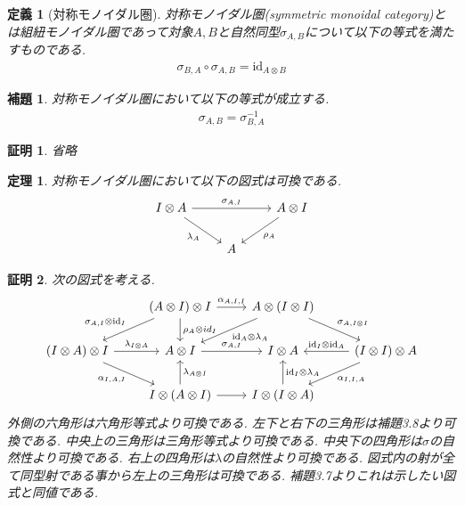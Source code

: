\documentclass[a4paper,12pt]{ltjsarticle}
\theoremstyle{break}
\newtheorem{defn}[thm]{定義}
\newtheorem{lem}[thm]{補題}
\newtheorem{thrm}[thm]{定理}
\newtheorem{eg}[thm]{例}
\newtheorem*{prf}{証明}
\newcommand{\rel}{\mathbf{Rel}}
\newcommand{\xr}[1]{\xrightarrow{#1}}
\newcommand{\id}{\mathrm{id}}
\newcommand{\ci}{\circ}
\newcommand{\al}{\alpha}
\newcommand{\la}{\lambda}
\newcommand{\si}{\sigma}
\newcommand{\ot}{\otimes}
\newcommand{\ti}{\times}
\numberwithin{equation}{section}
\begin{document}

\begin{defn}[対称モノイダル圏]
  対称モノイダル圏(symmetric monoidal category)とは組紐モノイダル圏であって対象$A,B$と自然同型$\si_{A,B}$について以下の等式を満たすものである. 
  \begin{align*}
    \si_{B,A} \ci \si_{A,B} = \id_{A \ot B}
  \end{align*}
\end{defn}

\begin{lem}
  対称モノイダル圏において以下の等式が成立する. 
  \begin{align*}
    \si_{A,B}=\si_{B,A}^{-1}
  \end{align*}
\end{lem} 

\begin{prf}
  省略
\end{prf}

\begin{thrm}
  対称モノイダル圏において以下の図式は可換である. 
  \[\begin{tikzcd}
    {I \ot A} && {A \ot I} \\
    & A
    \arrow["{\si_{A,I}}", from=1-1, to=1-3]
    \arrow["{\la_A}"', from=1-1, to=2-2]
    \arrow["{\rho_A}", from=1-3, to=2-2]
  \end{tikzcd}\]
\end{thrm}

\begin{prf}
  次の図式を考える. 
  \[\begin{tikzcd}
    & {(A \ot I) \ot I} & {A \ot (I \ot I)} \\
    {(I \ot A) \ot I} & {A \ot I} & {I \ot A} & {(I \ot I) \ot A} \\
    & {I \ot (A \ot I)} & {I \ot (I \ot A)}
    \arrow["{\si_{A,I} \ot \id_I}"', from=1-2, to=2-1]
    \arrow["{\rho_A \ot id_I}", from=1-2, to=2-2]
    \arrow["{\la_{I \ot A}}", from=2-1, to=2-2]
    \arrow["{\al_{I,A,I}}"', from=2-1, to=3-2]
    \arrow["{\la_{A \ot I}}"', from=3-2, to=2-2]
    \arrow["{\al_{A,I,I}}", from=1-2, to=1-3]
    \arrow["{\id_A \ot \la_A}", from=1-3, to=2-2]
    \arrow["{\si_{A,I}}", from=2-2, to=2-3]
    \arrow["{\id_I \ot \id_A}"', from=2-4, to=2-3]
    \arrow["{\al_{I,I,A}}", from=2-4, to=3-3]
    \arrow["{\id_I \ot \la_A}"', from=3-3, to=2-3]
    \arrow[from=3-2, to=3-3]
    \arrow["{\si_{A,I \ot I}}", from=1-3, to=2-4]
  \end{tikzcd}\]
  外側の六角形は六角形等式より可換である. 
  左下と右下の三角形は補題3.8より可換である. 
  中央上の三角形は三角形等式より可換である. 
  中央下の四角形は$\si$の自然性より可換である. 
  右上の四角形は$\la$の自然性より可換である. 
  図式内の射が全て同型射である事から左上の三角形は可換である. 
  補題3.7よりこれは示したい図式と同値である. 
\end{prf}
\end{document}

